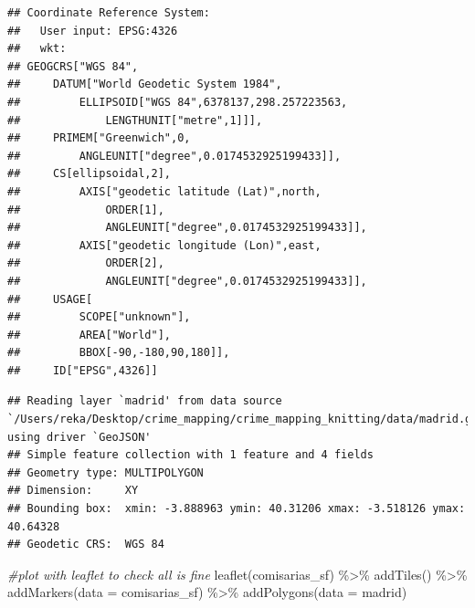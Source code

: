 \documentclass[
]{book}
\newenvironment{Shaded}{\begin{snugshade}}{\end{snugshade}}
\newcommand{\AttributeTok}[1]{\textcolor[rgb]{0.77,0.63,0.00}{#1}}
\newcommand{\CommentTok}[1]{\textcolor[rgb]{0.56,0.35,0.01}{\textit{#1}}}
\newcommand{\FunctionTok}[1]{\textcolor[rgb]{0.00,0.00,0.00}{#1}}
\newcommand{\NormalTok}[1]{#1}
\newcommand{\OtherTok}[1]{\textcolor[rgb]{0.56,0.35,0.01}{#1}}
\newcommand{\SpecialCharTok}[1]{\textcolor[rgb]{0.00,0.00,0.00}{#1}}
\newcommand{\StringTok}[1]{\textcolor[rgb]{0.31,0.60,0.02}{#1}}
\begin{document}
\begin{verbatim}
## Coordinate Reference System:
##   User input: EPSG:4326 
##   wkt:
## GEOGCRS["WGS 84",
##     DATUM["World Geodetic System 1984",
##         ELLIPSOID["WGS 84",6378137,298.257223563,
##             LENGTHUNIT["metre",1]]],
##     PRIMEM["Greenwich",0,
##         ANGLEUNIT["degree",0.0174532925199433]],
##     CS[ellipsoidal,2],
##         AXIS["geodetic latitude (Lat)",north,
##             ORDER[1],
##             ANGLEUNIT["degree",0.0174532925199433]],
##         AXIS["geodetic longitude (Lon)",east,
##             ORDER[2],
##             ANGLEUNIT["degree",0.0174532925199433]],
##     USAGE[
##         SCOPE["unknown"],
##         AREA["World"],
##         BBOX[-90,-180,90,180]],
##     ID["EPSG",4326]]
\end{verbatim}

\begin{Shaded}
\end{Shaded}

\begin{verbatim}
## Reading layer `madrid' from data source `/Users/reka/Desktop/crime_mapping/crime_mapping_knitting/data/madrid.geojson' using driver `GeoJSON'
## Simple feature collection with 1 feature and 4 fields
## Geometry type: MULTIPOLYGON
## Dimension:     XY
## Bounding box:  xmin: -3.888963 ymin: 40.31206 xmax: -3.518126 ymax: 40.64328
## Geodetic CRS:  WGS 84
\end{verbatim}

\begin{Shaded}
\begin{Highlighting}[]
\CommentTok{\#plot with leaflet to check all is fine}
\FunctionTok{leaflet}\NormalTok{(comisarias\_sf) }\SpecialCharTok{\%\textgreater{}\%} 
  \FunctionTok{addTiles}\NormalTok{() }\SpecialCharTok{\%\textgreater{}\%}
  \FunctionTok{addMarkers}\NormalTok{(}\AttributeTok{data =}\NormalTok{ comisarias\_sf) }\SpecialCharTok{\%\textgreater{}\%}
  \FunctionTok{addPolygons}\NormalTok{(}\AttributeTok{data =}\NormalTok{ madrid)}
\end{Highlighting}
\end{Shaded}
\end{document}
